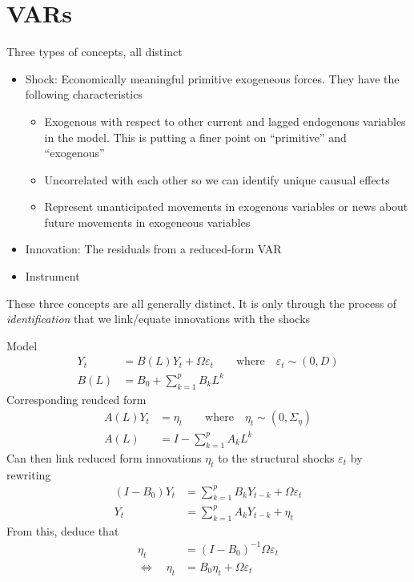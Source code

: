 \documentclass[12pt]{article}
\theoremstyle{plain}
\theoremstyle{definition}
\theoremstyle{remark}
\begin{document}
\clearpage
\section{VARs}

Three types of concepts, all distinct
\begin{itemize}
  \item Shock: Economically meaningful primitive exogeneous forces.
    They have the following characteristics
    \begin{itemize}
      \item Exogenous with respect to other current and lagged endogenous
        variables in the model. This is putting a finer point on
        ``primitive'' and ``exogenous''
      \item Uncorrelated with each other so we can identify unique
        causual effects
      \item Represent unanticipated movements in exogenous variables or
        news about future movements in exogeneous variables
    \end{itemize}
  \item Innovation: The residuals from a reduced-form VAR
  \item Instrument
\end{itemize}
These three concepts are all generally distinct.
It is only through the process of \emph{identification} that we
link/equate innovations with the shocks

Model
\begin{align*}
  Y_t
  &= B(L)Y_t + \Omega \varepsilon_t
  \qquad\text{where}\quad
  \varepsilon_t \sim (0,D)
  \\
  B(L)
  &= B_0 + \sum_{k=1}^p B_kL^k
\end{align*}
Corresponding reudced form
\begin{align*}
  A(L)Y_t
  &= \eta_t
  \qquad\text{where}\quad
  \eta_t
  \sim (0,\Sigma_\eta)
  \\
  A(L)
  &= I-\sum_{k=1}^p A_kL^k
\end{align*}
Can then link reduced form innovations $\eta_t$ to the structural shocks
$\varepsilon_t$ by rewriting
\begin{align*}
  (I-B_0)Y_t
  &=
  \sum_{k=1}^p B_k Y_{t-k}
  +
  \Omega \varepsilon_t
  \\
  Y_t
  &=
  \sum_{k=1}^p A_k Y_{t-k}
  +
  \eta_t
\end{align*}
From this, deduce that
\begin{align*}
  \eta_t
  &=
  (I-B_0)^{-1}\Omega\varepsilon_t
  \\
  \iff\quad
  \eta_t
  &= B_0\eta_t + \Omega \varepsilon_t
\end{align*}
\end{document}
